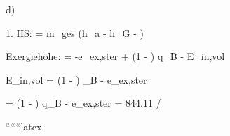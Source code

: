 d)

1. HS:  = m_{ges} (h_{a} - h_{G} - )

Exergiehöhe:  = -e_{ex,ster} + \left(1 - \right) q_{B} - E_{in,vol}

\Rightarrow \quad E_{in,vol} = \left(1 - \right) _{B} - e_{ex,ster} \quad {}

= \left(1 - \right) q_{B} - e_{ex,ster} = 844.11  / 

``````latex
